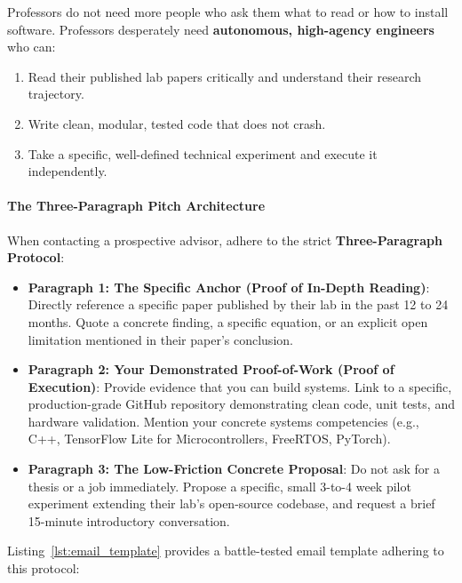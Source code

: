 \begin{keyidea}
Professors do not need more people who ask them what to read or how to install software. Professors desperately need \textbf{autonomous, high-agency engineers} who can:
\begin{enumerate}
    \item Read their published lab papers critically and understand their research trajectory.
    \item Write clean, modular, tested code that does not crash.
    \item Take a specific, well-defined technical experiment and execute it independently.
\end{enumerate}
\end{keyidea}

\paragraph{The Three-Paragraph Pitch Architecture}
When contacting a prospective advisor, adhere to the strict \textbf{Three-Paragraph Protocol}:

\begin{itemize}
    \item \textbf{Paragraph 1: The Specific Anchor (Proof of In-Depth Reading)}:
    Directly reference a specific paper published by their lab in the past 12 to 24 months. Quote a concrete finding, a specific equation, or an explicit open limitation mentioned in their paper's conclusion.
    \item \textbf{Paragraph 2: Your Demonstrated Proof-of-Work (Proof of Execution)}:
    Provide evidence that you can build systems. Link to a specific, production-grade GitHub repository demonstrating clean code, unit tests, and hardware validation. Mention your concrete systems competencies (e.g., C++, TensorFlow Lite for Microcontrollers, FreeRTOS, PyTorch).
    \item \textbf{Paragraph 3: The Low-Friction Concrete Proposal}:
    Do not ask for a thesis or a job immediately. Propose a specific, small 3-to-4 week pilot experiment extending their lab's open-source codebase, and request a brief 15-minute introductory conversation.
\end{itemize}

Listing~\ref{lst:email_template} provides a battle-tested email template adhering to this protocol:

